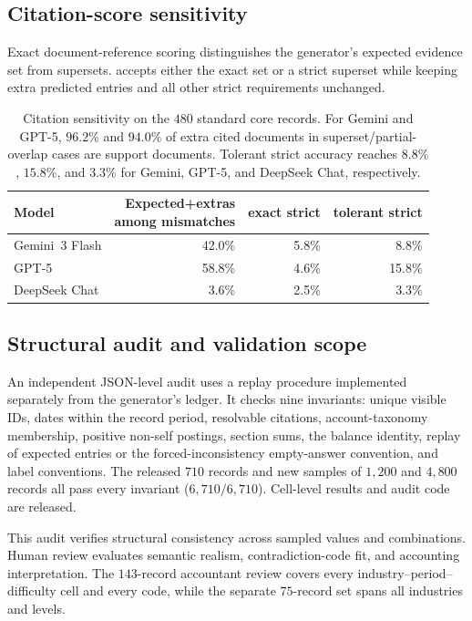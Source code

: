 \subsection{Citation-score sensitivity}
\label{appx:citation-sensitivity}

Exact document-reference scoring distinguishes the generator's expected evidence set from supersets.  accepts either the exact set or a strict superset while keeping extra predicted entries and all other strict requirements unchanged.

\begin{table}[t]
\centering
\small
\setlength{\tabcolsep}{4pt}
\begin{tabular}{@{}lrrr@{}}
\toprule
Model & \shortstack{Expected+extras\\among mismatches} & exact strict & tolerant strict \\
\midrule
Gemini~3 Flash & 42.0\% & 5.8\% & 8.8\% \\
GPT-5 & 58.8\% & 4.6\% & 15.8\% \\
DeepSeek Chat & 3.6\% & 2.5\% & 3.3\% \\
\bottomrule
\end{tabular}
\caption{Citation sensitivity on the $480$ standard core records. For Gemini and GPT-5, $96.2\%$ and $94.0\%$ of extra cited documents in superset/partial-overlap cases are support documents. Tolerant strict accuracy reaches $8.8\%$, $15.8\%$, and $3.3\%$ for Gemini, GPT-5, and DeepSeek Chat, respectively.}
\label{tab:citation-sensitivity}
\end{table}

\subsection{Structural audit and validation scope}
\label{appx:structural-audit}

An independent JSON-level audit uses a replay procedure implemented separately from the generator's ledger. It checks nine invariants: unique visible IDs, dates within the record period, resolvable citations, account-taxonomy membership, positive non-self postings, section sums, the balance identity, replay of expected entries or the forced-inconsistency empty-answer convention, and label conventions. The released $710$ records and new samples of $1{,}200$ and $4{,}800$ records all pass every invariant ($6{,}710/6{,}710$). Cell-level results and audit code are released.

This audit verifies structural consistency across sampled values and combinations. Human review evaluates semantic realism, contradiction-code fit, and accounting interpretation. The $143$-record accountant review covers every industry--period--difficulty cell and every code, while the separate $75$-record set spans all industries and levels.

